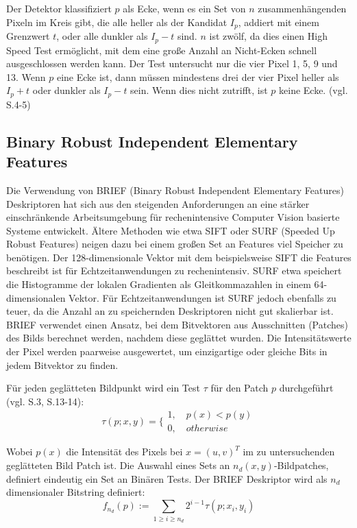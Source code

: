 Der Detektor klassifiziert $p$ als Ecke, wenn es ein Set von $n$ zusammenhängenden Pixeln im Kreis gibt, die alle heller als der Kandidat $I_p$, addiert mit einem Grenzwert $t$, oder alle dunkler als $I_p - t$ sind. $n$ ist zwölf, da dies einen High Speed Test ermöglicht, mit dem eine große Anzahl an Nicht-Ecken schnell ausgeschlossen werden kann. Der Test untersucht nur die vier Pixel 1, 5, 9 und 13. Wenn $p$ eine Ecke ist, dann müssen mindestens drei der vier Pixel heller als $I_p + t$ oder dunkler als $I_p - t$  sein. Wenn dies nicht zutrifft, ist $p$ keine Ecke. (vgl. \cite{fast} S.4-5)

\subsection{Binary Robust Independent Elementary Features}

Die Verwendung von BRIEF (Binary Robust Independent Elementary Features) Deskriptoren hat sich  aus den steigenden Anforderungen an eine stärker einschränkende Arbeitsumgebung für rechenintensive Computer Vision basierte Systeme entwickelt. Ältere Methoden wie etwa SIFT oder SURF (Speeded Up Robust Features) neigen dazu bei einem großen Set an Features viel Speicher zu benötigen. Der 128-dimensionale Vektor mit dem beispielsweise SIFT die Features beschreibt ist für Echtzeitanwendungen zu rechenintensiv. SURF etwa speichert die Histogramme der lokalen Gradienten als Gleitkommazahlen in einem 64-dimensionalen Vektor. Für Echtzeitanwendungen ist SURF jedoch ebenfalls zu teuer, da die Anzahl an zu speichernden Deskriptoren nicht gut skalierbar ist. BRIEF verwendet einen Ansatz, bei dem Bitvektoren aus Ausschnitten (Patches) des Bilds berechnet werden, nachdem diese geglättet wurden. Die Intensitätswerte der Pixel werden paarweise ausgewertet, um einzigartige oder gleiche Bits in jedem Bitvektor zu finden. 

Für jeden geglätteten Bildpunkt wird ein Test $\tau$ für den Patch $p$ durchgeführt (vgl. \cite{brief} S.3, \cite{orb_slam} S.13-14):
\begin{equation}
\tau(p;x,y)= \biggl\{ \begin{array}{ll}
         1, \quad p(x)<p(y)\\
        0, \quad otherwise\end{array}
\end{equation}

Wobei $p(x)$ die Intensität des Pixels bei $x=(u,v)^T$ im zu untersuchenden geglätteten Bild Patch ist. Die Auswahl eines Sets an $n_d (x,y)$-Bildpatches, definiert eindeutig ein Set an Binären Tests. Der BRIEF Deskriptor wird als $n_d$ dimensionaler Bitstring definiert:
\begin{equation}
f_{n_d}(p):= \sum_{1\geq i \geq n_d} 2^{i-1} \tau (p;x_i,y_i)
\end{equation}


